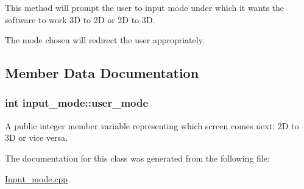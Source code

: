 This method will prompt the user to input mode under which it wants the software to work 3D to 2D or 2D to 3D. 

The mode chosen will redirect the user appropriately. 

\subsection{Member Data Documentation}
\subsubsection[{\texorpdfstring{user\+\_\+mode}{user_mode}}]{\setlength{\rightskip}{0pt plus 5cm}int input\+\_\+mode\+::user\+\_\+mode}\hypertarget{classinput__mode_ae21dca33a5290ebe9d4e75d9378ef206}{}\label{classinput__mode_ae21dca33a5290ebe9d4e75d9378ef206}


A public integer member variable representing which screen comes next\+: 2D to 3D or vice versa. 



The documentation for this class was generated from the following file\+:\begin{DoxyCompactItemize}
\item 
\hyperlink{Input__mode_8cpp}{Input\+\_\+mode.\+cpp}\end{DoxyCompactItemize}
